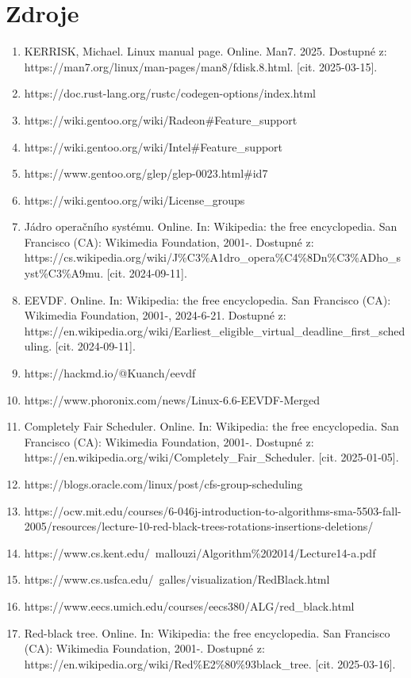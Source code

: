 \documentclass[12pt,a4paper,twoside,]{article}
\begin{document}
{{{{{{\section{\textsf{Zdroje}}
\begin{enumerate}
	\item KERRISK, Michael. Linux manual page. Online. Man7. 2025. Dostupné z: https://man7.org/linux/man-pages/man8/fdisk.8.html. [cit. 2025-03-15].
	\item https://doc.rust-lang.org/rustc/codegen-options/index.html
	\item https://wiki.gentoo.org/wiki/Radeon\#Feature\_support
	\item https://wiki.gentoo.org/wiki/Intel\#Feature\_support
	\item https://www.gentoo.org/glep/glep-0023.html\#id7
	\item https://wiki.gentoo.org/wiki/License\_groups
	\item Jádro operačního systému. Online. In: Wikipedia: the free encyclopedia. San Francisco (CA): Wikimedia Foundation, 2001-. Dostupné z: https://cs.wikipedia.org/wiki/J\%C3\%A1dro\_opera\%C4\%8Dn\%C3\%ADho\_syst\%C3\%A9mu. [cit. 2024-09-11].
	\item EEVDF. Online. In: Wikipedia: the free encyclopedia. San Francisco (CA): Wikimedia Foundation, 2001-, 2024-6-21. Dostupné z: https://en.wikipedia.org/wiki/Earliest\_eligible\_virtual\_deadline\_first\_scheduling. [cit. 2024-09-11].
	\item https://hackmd.io/@Kuanch/eevdf
	\item https://www.phoronix.com/news/Linux-6.6-EEVDF-Merged
	\item Completely Fair Scheduler. Online. In: Wikipedia: the free encyclopedia. San Francisco (CA): Wikimedia Foundation, 2001-. Dostupné z: https://en.wikipedia.org/wiki/Completely\_Fair\_Scheduler. [cit. 2025-01-05].
	\item https://blogs.oracle.com/linux/post/cfs-group-scheduling
	\item https://ocw.mit.edu/courses/6-046j-introduction-to-algorithms-sma-5503-fall-2005/resources/lecture-10-red-black-trees-rotations-insertions-deletions/
	\item https://www.cs.kent.edu/~mallouzi/Algorithm\%202014/Lecture14-a.pdf
	\item https://www.cs.usfca.edu/~galles/visualization/RedBlack.html
	\item https://www.eecs.umich.edu/courses/eecs380/ALG/red\_black.html
	\item Red-black tree. Online. In: Wikipedia: the free encyclopedia. San Francisco (CA): Wikimedia Foundation, 2001-. Dostupné z: https://en.wikipedia.org/wiki/Red\%E2\%80\%93black\_tree. [cit. 2025-03-16].

\end{enumerate}}}}}}}
\end{document}

